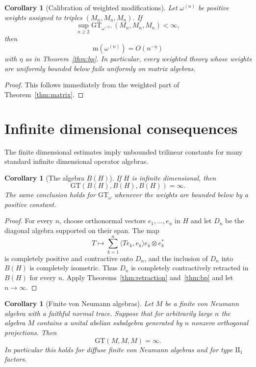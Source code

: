 \documentclass[11pt]{amsart}
\newtheorem{corollary}[theorem]{Corollary}
\theoremstyle{definition}
\newcommand{\ot}{\otimes}
\newcommand{\minw}{\mathrm{m}}
\newcommand{\GT}{\mathrm{GT}}
\begin{document}
\begin{corollary}[Calibration of weighted modifications]
\label{cor:weights}
Let $\omega^{(n)}$ be positive weights assigned to triples
$(M_n,M_n,M_n)$. If
\[
   \sup_{n\ge2}\GT_{\omega^{(n)}}(M_n,M_n,M_n)<\infty ,
\]
then
\[
   \minw(\omega^{(n)})=O(n^{-\eta})
\]
with $\eta$ as in Theorem~\ref{thm:bp}. In particular, every weighted theory
whose weights are uniformly bounded below fails uniformly on matrix
algebras.
\end{corollary}

\begin{proof}
This follows immediately from the weighted part of Theorem~\ref{thm:matrix}.
\end{proof}

\section{Infinite dimensional consequences}

The finite dimensional estimates imply unbounded trilinear constants for many
standard infinite dimensional operator algebras.

\begin{corollary}[The algebra \(B(H)\)]
\label{cor:bh}
If $H$ is infinite dimensional, then
\[
   \GT(B(H),B(H),B(H))=\infty .
\]
The same conclusion holds for $\GT_\omega$ whenever the weights are bounded
below by a positive constant.
\end{corollary}

\begin{proof}
For every $n$, choose orthonormal vectors $e_1,\ldots,e_n$ in $H$ and let
$D_n$ be the diagonal algebra supported on their span. The map
\[
   T\mapsto \sum_{k=1}^n \langle Te_k,e_k\rangle e_k\ot e_k^*
\]
is completely positive and contractive onto $D_n$, and the inclusion of
$D_n$ into $B(H)$ is completely isometric. Thus $D_n$ is completely
contractively retracted in $B(H)$ for every $n$. Apply
Theorems~\ref{thm:retraction} and~\ref{thm:bp} and let $n\to\infty$.
\end{proof}

\begin{corollary}[Finite von Neumann algebras]
\label{cor:finite-vn}
Let $M$ be a finite von Neumann algebra with a faithful normal trace. Suppose
that for arbitrarily large $n$ the algebra $M$ contains a unital abelian
subalgebra generated by $n$ nonzero orthogonal projections. Then
\[
   \GT(M,M,M)=\infty .
\]
In particular this holds for diffuse finite von Neumann algebras and for
type $\mathrm{II}_1$ factors.
\end{corollary}
\end{document}
